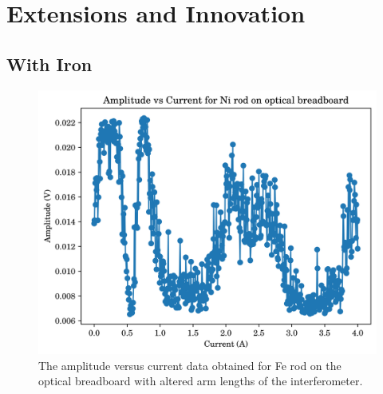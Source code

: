 \chapter{\label{method}Extensions and Innovation}
\section{With Iron}
\begin{figure}
	\centering
	\includegraphics{data/ob-Fe-0}
	\caption{The amplitude versus current data obtained for Fe rod on the optical breadboard with altered arm lengths of the interferometer.}
	\label{fig:ob-fe-0}
\end{figure}

